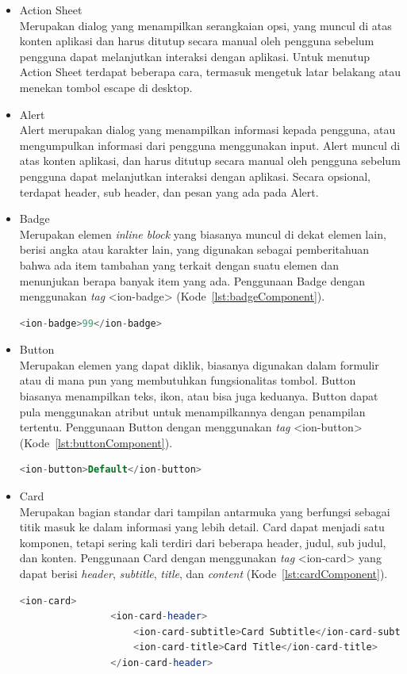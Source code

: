 \begin{itemize}
	\item Action Sheet \\
	Merupakan dialog yang menampilkan serangkaian opsi, yang muncul di atas konten aplikasi dan harus ditutup secara manual oleh pengguna sebelum pengguna dapat melanjutkan interaksi dengan aplikasi. Untuk menutup Action Sheet terdapat beberapa cara, termasuk mengetuk latar belakang atau menekan tombol escape di desktop.

	\item Alert \\
	Alert merupakan dialog yang menampilkan informasi kepada pengguna, atau mengumpulkan informasi dari pengguna menggunakan input. Alert muncul di atas konten aplikasi, dan harus ditutup secara manual oleh pengguna sebelum pengguna dapat melanjutkan interaksi dengan aplikasi. Secara opsional, terdapat header, sub header, dan pesan yang ada pada Alert.
	\item Badge \\
	Merupakan elemen {\it inline block} yang biasanya muncul di dekat elemen lain, berisi angka atau karakter lain, yang digunakan sebagai pemberitahuan bahwa ada item tambahan yang terkait dengan suatu elemen dan menunjukan berapa banyak item yang ada. Penggunaan Badge dengan menggunakan {\it tag} <ion-badge> (Kode~\ref{lst:badgeComponent}).
	\begin{lstlisting}[language=php, label={lst:badgeComponent}, caption=Potongan Kode Program dari Badge Component]
			<ion-badge>99</ion-badge>
	\end{lstlisting} 
	\item Button \\
	Merupakan elemen yang dapat diklik, biasanya digunakan dalam formulir atau di mana pun yang membutuhkan fungsionalitas tombol. Button biasanya menampilkan teks, ikon, atau bisa juga keduanya. Button dapat pula menggunakan atribut untuk menampilkannya dengan penampilan tertentu. Penggunaan Button dengan menggunakan {\it tag} <ion-button>  (Kode~\ref{lst:buttonComponent}).
	\begin{lstlisting}[language=php, label={lst:buttonComponent}, caption=Potongan Kode Program dari Button Component]
			<ion-button>Default</ion-button>
	\end{lstlisting} 

\newpage

	\item Card \\
	Merupakan bagian standar dari tampilan antarmuka yang berfungsi sebagai titik masuk ke dalam informasi yang lebih detail. Card dapat menjadi satu komponen, tetapi sering kali terdiri dari beberapa header, judul, sub judul, dan konten. Penggunaan Card dengan menggunakan {\it tag} <ion-card> yang dapat berisi {\it header}, {\it subtitle}, {\it title}, dan {\it content} (Kode~\ref{lst:cardComponent}).
	\begin{lstlisting}[language=php, label={lst:cardComponent}, caption=Potongan Kode Program dari Card Component]
			<ion-card>
				<ion-card-header>
					<ion-card-subtitle>Card Subtitle</ion-card-subtitle>
					<ion-card-title>Card Title</ion-card-title>
				</ion-card-header>
				

\end{lstlisting}
\end{itemize}

